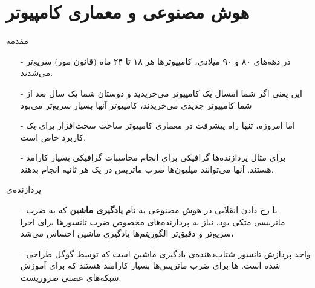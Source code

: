 \section{هوش مصنوعی و معماری کامپیوتر}
\begin{frame}{مقدمه}
\begin{itemize}\itemr
\item[-]
در دهه‌های ۸۰ و ۹۰ میلادی، کامپیوتر‌‌ها هر ۱۸ تا ۲۴ ماه (قانون مور) سریع‌تر می‌شدند.
\item[-]
این یعنی اگر شما امسال یک کامپیوتر می‌خریدید و دوستان شما یک سال بعد از شما کامپیوتر جدیدی می‌خریدند، کامپیوتر‌ آنها بسیار سریع‌تر می‌بود
\item[-]
اما امروزه، تنها راه پیشرفت در معماری کامپیوتر ساخت سخت‌افزار برای یک کاربرد خاص است.
\item[-]
برای مثال پردازند‌ه‌ها گرافیکی
برای انجام محاسبات گرافیکی بسیار کارامد هستند. آنها می‌توانند میلیون‌ها ضرب ماتریس در یک هر ثانیه انجام بدهند.
\end{itemize}
\end{frame}

\begin{frame}{پردازنده‌ی }
\begin{itemize}\itemr
\item[-]
با رخ دادن انقلابی در هوش مصنوعی به نام \textbf{یادگیری ماشین} که به ضرب ماتریسی متکی بود، نیاز به پردازنده‌های مخصوص ضرب تانسور‌ها برای اجرا سریع‌تر و دقیق‌تر الگوریتم‌ها یادگیری ماشین احساس می‌شد،
\item[-]
واحد پردازش تانسور
شتاب‌دهنده‌ی یادگیری ماشین است که توسط گوگل طراحی شده است. 
ها
برای ضرب ماتریس‌ها بسیار کارامند هستند که برای آموزش شبکه‌های عصبی 
ضروریست.
\end{itemize}
\end{frame}